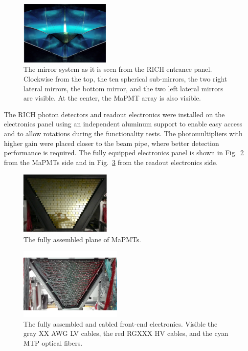 \documentclass[5p,times,twocolumn]{elsarticle}
\begin{document}
\begin{figure}
\begin{center}
\includegraphics[width=0.4\textwidth]{mirrors.pdf}
\caption{The mirror system as it is seen from the RICH entrance panel. Clockwise from the top, the ten spherical
  sub-mirrors, the two right lateral mirrors, the bottom mirror, and the two left lateral mirrors are visible. At the
  center, the MaPMT array is also visible.}
\label{fig:mirrors}
\end{center}
\end{figure}

The RICH photon detectors and readout electronics were installed on the electronics panel using an independent
aluminum support to enable easy access and to allow rotations during the functionality tests. The photomultipliers
with higher gain were placed closer to the beam pipe, where better detection performance is required. The fully
equipped electronics panel is shown in Fig.~\ref{fig:MaPMTs} from the MaPMTs side and in
Fig.~\ref{fig:electronics} from the readout electronics side.

\begin{figure}
\begin{center}
\includegraphics[width=0.4\textwidth]{MaPMT.pdf}
\caption{The fully assembled plane of MaPMTs.}
\label{fig:MaPMTs}
\end{center}
\end{figure}

\begin{figure}
\begin{center}
\includegraphics[width=0.45\textwidth]{electronics.pdf}
\caption{The fully assembled and cabled front-end electronics. Visible the gray XX AWG LV cables, the red
  RGXXX HV cables, and the cyan MTP optical fibers.}
\label{fig:electronics}
\end{center}
\end{figure}
\end{document}
